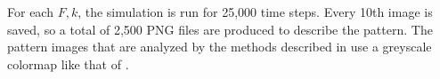 For each $F, k$, the simulation is run for 25,000 time steps. Every 10th image is saved, so a total of 2,500 PNG files are produced to describe the pattern. The pattern images that are analyzed by the methods described in  use a greyscale colormap like that of .



